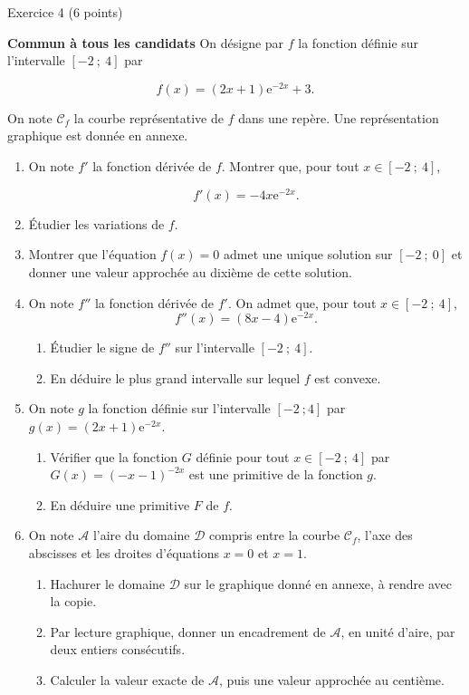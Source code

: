 
%
\begin{h2}Exercice 4 (6 points)\end{h2}
\textbf{Commun à  tous les candidats}
\medbreak
On désigne par $f$ la fonction définie sur l'intervalle $[-2~;~4]$ par
\par
\[f(x) = (2x+1)\text{e}^{-2x}+3.\]
\par
On note $\mathscr{C}_f$ la courbe représentative de $f$ dans une repère. Une représentation graphique est donnée en annexe.
\begin{enumerate}
     \item On note $f'$ la fonction dérivée de $f$. Montrer que, pour tout $x\in  [-2~;~4]$,
     \par
     \[f'(x)=-4x\text{e}^{-2x}.\]
     \item Étudier les variations de $f$.
     \item Montrer que l'équation $f(x) = 0$ admet une unique solution sur $[-2~;~0]$ et donner une valeur approchée au dixième de cette solution.
     \item On note $f''$ la fonction dérivée de $f'$. On admet que, pour tout $x\in [-2~;~4]$,
     \[f''(x)=(8x-4)\text{e}^{-2x}.\]
     \begin{enumerate}[label=\alph*.]
          \item Étudier le signe de $f''$ sur l'intervalle $[-2~;~4]$.
          \item En déduire le plus grand intervalle sur lequel $f$ est convexe.
     \end{enumerate}
     \item On note $g$ la fonction définie sur l'intervalle $[-2~; 4]$ par $g(x)=(2x+1)\text{e}^{-2x}$.
     \begin{enumerate}[label=\alph*.]
          \item Vérifier que la fonction $G$ définie pour tout $x\in [-2~;~4]$ par $G(x)=(-x-1)^{-2x}$ est une primitive de la fonction $g$.
          \item En déduire une primitive $F$ de $f$.
     \end{enumerate}
     \item On note $\mathscr{A}$ l'aire du domaine $\mathscr{D}$ compris entre la courbe $\mathscr{C}_f$, l'axe des abscisses et les droites d'équations $x=0$ et $x=1$.
     \begin{enumerate}[label=\alph*.]
          \item Hachurer le domaine $\mathscr{D}$ sur le graphique donné en annexe, à rendre avec la copie.
          \item Par lecture graphique, donner un encadrement de $\mathscr{A}$, en unité d'aire, par deux entiers consécutifs.
          \item Calculer la valeur exacte de $\mathscr{A}$, puis une valeur approchée au centième.
     \end{enumerate}
\end{enumerate}
